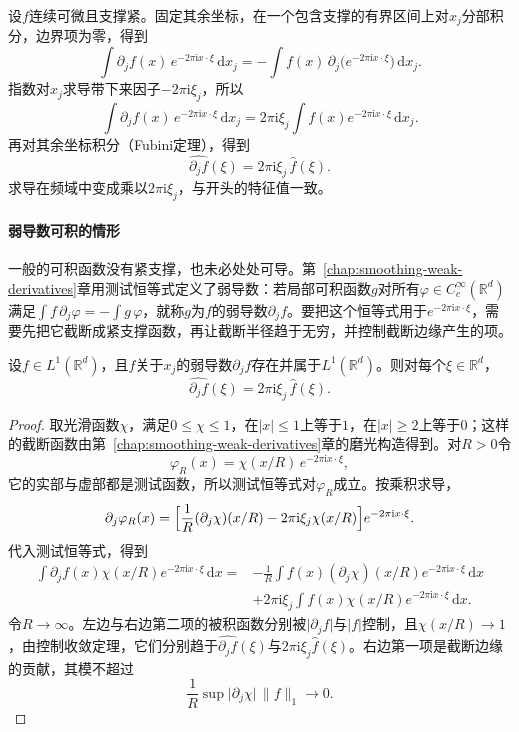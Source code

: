 设$f$连续可微且支撑紧。固定其余坐标，在一个包含支撑的有界区间上对$x_j$分部积分，边界项为零，得到
\[
\int\partial_jf(x)\,e^{-2\pi\mathrm ix\cdot\xi}\,\mathrm dx_j=-\int f(x)\,\partial_j\bigl(e^{-2\pi\mathrm ix\cdot\xi}\bigr)\,\mathrm dx_j.
\]
指数对$x_j$求导带下来因子$-2\pi\mathrm i\xi_j$，所以
\[
\int\partial_jf(x)\,e^{-2\pi\mathrm ix\cdot\xi}\,\mathrm dx_j=2\pi\mathrm i\xi_j\int f(x)e^{-2\pi\mathrm ix\cdot\xi}\,\mathrm dx_j.
\]
再对其余坐标积分（Fubini定理），得到
\[
\widehat{\partial_jf}(\xi)=2\pi\mathrm i\xi_j\,\widehat f(\xi).
\]
求导在频域中变成乘以$2\pi\mathrm i\xi_j$，与开头的特征值一致。

\paragraph{弱导数可积的情形}

一般的可积函数没有紧支撑，也未必处处可导。第~\ref{chap:smoothing-weak-derivatives}章用测试恒等式定义了弱导数：若局部可积函数$g$对所有$\varphi\in C_c^\infty(\mathbb R^d)$满足$\int f\,\partial_j\varphi=-\int g\,\varphi$，就称$g$为$f$的弱导数$\partial_jf$。要把这个恒等式用于$e^{-2\pi\mathrm ix\cdot\xi}$，需要先把它截断成紧支撑函数，再让截断半径趋于无穷，并控制截断边缘产生的项。

\begin{theorem}[微分规则]
\label{thm:fourier-derivative}
设$f\in L^1(\mathbb R^d)$，且$f$关于$x_j$的弱导数$\partial_jf$存在并属于$L^1(\mathbb R^d)$。则对每个$\xi\in\mathbb R^d$，
\begin{equation}
\widehat{\partial_jf}(\xi)=2\pi\mathrm i\xi_j\,\widehat f(\xi).
\label{eq:fourier-derivative}
\end{equation}
\end{theorem}

\begin{proof}
取光滑函数$\chi$，满足$0\leq\chi\leq1$，在$\lvert x\rvert\leq1$上等于$1$，在$\lvert x\rvert\geq2$上等于$0$；这样的截断函数由第~\ref{chap:smoothing-weak-derivatives}章的磨光构造得到。对$R>0$令
\[
\varphi_R(x)=\chi(x/R)\,e^{-2\pi\mathrm ix\cdot\xi},
\]
它的实部与虚部都是测试函数，所以测试恒等式对$\varphi_R$成立。按乘积求导，
\[
\partial_j\varphi_R(x)=\Bigl[\frac1R(\partial_j\chi)(x/R)-2\pi\mathrm i\xi_j\chi(x/R)\Bigr]e^{-2\pi\mathrm ix\cdot\xi}.
\]
代入测试恒等式，得到
\[
\begin{aligned}
\int\partial_jf(x)\chi(x/R)e^{-2\pi\mathrm ix\cdot\xi}\,\mathrm dx
={}&-\frac1R\int f(x)(\partial_j\chi)(x/R)e^{-2\pi\mathrm ix\cdot\xi}\,\mathrm dx\\
&+2\pi\mathrm i\xi_j\int f(x)\chi(x/R)e^{-2\pi\mathrm ix\cdot\xi}\,\mathrm dx .
\end{aligned}
\]
令$R\to\infty$。左边与右边第二项的被积函数分别被$\lvert\partial_jf\rvert$与$\lvert f\rvert$控制，且$\chi(x/R)\to1$，由控制收敛定理，它们分别趋于$\widehat{\partial_jf}(\xi)$与$2\pi\mathrm i\xi_j\widehat f(\xi)$。右边第一项是截断边缘的贡献，其模不超过
\[
\frac1R\sup\lvert\partial_j\chi\rvert\,\lVert f\rVert_1\to0.
\]
\end{proof}

